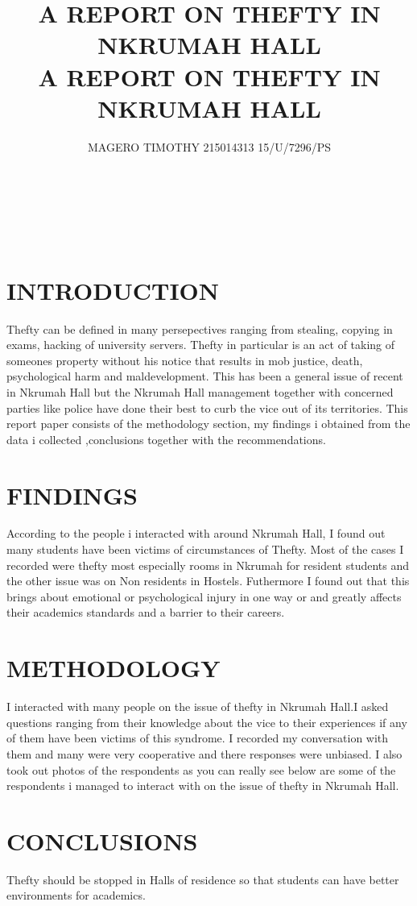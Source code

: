 \documentclass[10pt]{article}
\title{
	{A REPORT ON  THEFTY IN NKRUMAH HALL}\\
}
\author{
{MAGERO TIMOTHY 215014313   15/U/7296/PS}
}
\begin{document}
\title{	{A REPORT ON THEFTY IN NKRUMAH HALL}\\}
\maketitle

\

\

\section{INTRODUCTION}
{Thefty  can be defined in many persepectives ranging from stealing, copying in exams, hacking of university servers. Thefty in particular is an act of taking of someones property without his notice that results in mob justice, death, psychological harm and maldevelopment. This has been a general issue of recent in Nkrumah Hall but the Nkrumah Hall management together with concerned parties like police have done their best to curb the vice out of its territories. This report paper consists of the methodology section, my findings i obtained from the data i collected ,conclusions together with the recommendations.}

\section{FINDINGS}
{According to the people i interacted with around Nkrumah Hall, I found out many students have been victims of circumstances of Thefty. Most of the cases I recorded were thefty most especially rooms in Nkrumah for resident students and the other issue was on Non residents in Hostels. Futhermore I found out that this brings about emotional or psychological injury in one way or and greatly affects their academics standards and a barrier to their careers.
}

\section{METHODOLOGY}
{I interacted with many people on the issue of thefty in Nkrumah Hall.I asked questions ranging from their knowledge about the vice to their experiences if any of them have been victims of this syndrome. I recorded my conversation with them and many were very cooperative and there responses were unbiased. I also took out photos of  the respondents as you can really see below are some of the respondents i managed to interact with on the issue of thefty in Nkrumah Hall.}


\section{CONCLUSIONS}
{Thefty should be stopped in Halls of residence so that students can have better environments for academics.
}
\end{document}
